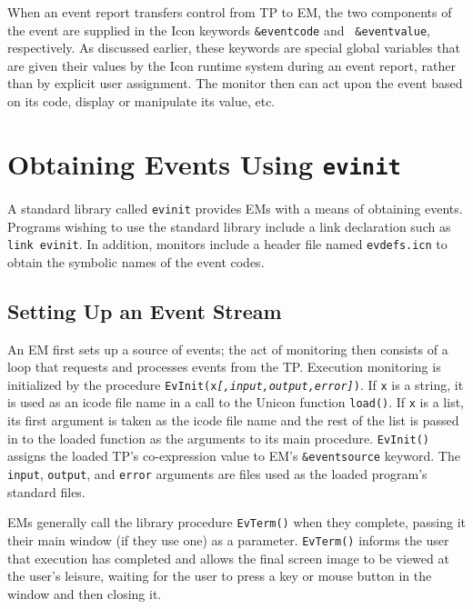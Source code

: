 When an event report transfers control from TP to EM, the two components of
the event are supplied in the Icon keywords {\tt \&eventcode} and {\tt
\&eventvalue}, respectively.
As discussed earlier, these
keywords are special global variables that are given their values by the
Icon runtime system during an event report, rather than by explicit user
assignment.  The monitor then
can act upon the event based on its code, display or manipulate its value,
etc.


\section{Obtaining Events Using {\tt evinit}}

A standard library called {\tt evinit} provides EMs with
a means of obtaining events.  Programs wishing to use the
standard library include a link declaration such as {\tt link
evinit}.
In addition, monitors include a header file named {\tt evdefs.icn}
to obtain the symbolic names of the event codes.

\subsection*{Setting Up an Event Stream}

\vspace{0.25pc}
\noindent
An EM first sets up a source of events; the act of monitoring then
consists of a loop that requests and processes events from the TP.
Execution monitoring is initialized by the procedure
{\tt EvInit(x{\em [,input,output,error]\/})}.  If {\tt x} is a string, it is
used as an icode file name in a call to the Unicon function {\tt load()}.
If {\tt x} is a list, its first argument is taken as the icode file name
and the rest of the list is passed in to the loaded function as the
arguments to its main procedure.
{\tt EvInit()} assigns the loaded
TP's co-expression value to EM's {\tt \&eventsource} keyword.
The {\tt input}, {\tt output}, and {\tt error} arguments are files
used as the loaded program's standard files.

EMs generally call the library procedure {\tt EvTerm()} when they complete,
passing it their main window (if they use one) as a parameter.
{\tt EvTerm()} informs the user that execution has completed and allows the
final screen image to be viewed at the user's leisure, waiting for the user to
press a key or mouse button in the window and then closing it.

